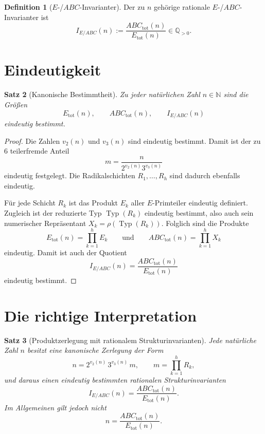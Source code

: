 \documentclass[11pt,a4paper]{article}
\newtheorem{satz}{Satz}
\theoremstyle{definition}
\newtheorem{definition}[satz]{Definition}
\theoremstyle{remark}
\newcommand{\N}{\mathbb{N}}
\newcommand{\Q}{\mathbb{Q}}
\newcommand{\Typ}{\operatorname{Typ}}
\begin{document}
	\begin{definition}[\(E\!\)-/\(ABC\)-Invarianter]
		Der zu \(n\) gehörige rationale \(E\!\)-/\(ABC\)-Invarianter ist
		\[
		I_{E/ABC}(n):=\frac{ABC_{\mathrm{tot}}(n)}{E_{\mathrm{tot}}(n)}\in\Q_{>0}.
		\]
	\end{definition}
	
	\section{Eindeutigkeit}
	
	\begin{satz}[Kanonische Bestimmtheit]
		Zu jeder natürlichen Zahl \(n\in\N\) sind die Größen
		\[
		E_{\mathrm{tot}}(n),\qquad ABC_{\mathrm{tot}}(n),\qquad I_{E/ABC}(n)
		\]
		eindeutig bestimmt.
	\end{satz}
	
	\begin{proof}
		Die Zahlen \(v_2(n)\) und \(v_3(n)\) sind eindeutig bestimmt. Damit ist der zu \(6\) teilerfremde
		Anteil
		\[
		m=\frac{n}{2^{v_2(n)}3^{v_3(n)}}
		\]
		eindeutig festgelegt. Die Radikalschichten \(R_1,\dots,R_h\) sind dadurch ebenfalls eindeutig.
		
		Für jede Schicht \(R_k\) ist das Produkt \(E_k\) aller \(E\)-Primteiler eindeutig definiert.
		Zugleich ist der reduzierte Typ \(\Typ(R_k)\) eindeutig bestimmt, also auch sein numerischer
		Repräsentant \(X_k=\rho(\Typ(R_k))\). Folglich sind die Produkte
		\[
		E_{\mathrm{tot}}(n)=\prod_{k=1}^h E_k
		\qquad\text{und}\qquad
		ABC_{\mathrm{tot}}(n)=\prod_{k=1}^h X_k
		\]
		eindeutig. Damit ist auch der Quotient
		\[
		I_{E/ABC}(n)=\frac{ABC_{\mathrm{tot}}(n)}{E_{\mathrm{tot}}(n)}
		\]
		eindeutig bestimmt.
	\end{proof}
	
	\section{Die richtige Interpretation}
	
	\begin{satz}[Produktzerlegung mit rationalem Strukturinvarianten]
		Jede natürliche Zahl \(n\) besitzt eine kanonische Zerlegung der Form
		\[
		n = 2^{v_2(n)}\,3^{v_3(n)}\,m,
		\qquad
		m=\prod_{k=1}^h R_k,
		\]
		und daraus einen eindeutig bestimmten rationalen Strukturinvarianten
		\[
		I_{E/ABC}(n)=\frac{ABC_{\mathrm{tot}}(n)}{E_{\mathrm{tot}}(n)}.
		\]
		Im Allgemeinen gilt jedoch nicht
		\[
		n=\frac{ABC_{\mathrm{tot}}(n)}{E_{\mathrm{tot}}(n)}.
		\]
	\end{satz}
	
\end{document}
